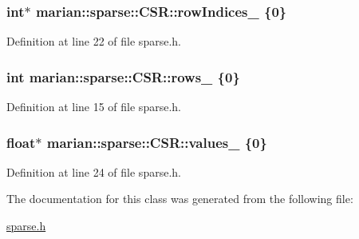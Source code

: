 \subsubsection[{\texorpdfstring{row\+Indices\+\_\+}{rowIndices_}}]{\setlength{\rightskip}{0pt plus 5cm}int$\ast$ marian\+::sparse\+::\+C\+S\+R\+::row\+Indices\+\_\+ \{0\}\hspace{0.3cm}{\ttfamily [private]}}\hypertarget{classmarian_1_1sparse_1_1CSR_a6d20131d1a2e8b89ed037bc6d4debdeb}{}\label{classmarian_1_1sparse_1_1CSR_a6d20131d1a2e8b89ed037bc6d4debdeb}


Definition at line 22 of file sparse.\+h.

\subsubsection[{\texorpdfstring{rows\+\_\+}{rows_}}]{\setlength{\rightskip}{0pt plus 5cm}int marian\+::sparse\+::\+C\+S\+R\+::rows\+\_\+ \{0\}\hspace{0.3cm}{\ttfamily [private]}}\hypertarget{classmarian_1_1sparse_1_1CSR_adc2e92a08b1ac2c6ace0c1283e4c353e}{}\label{classmarian_1_1sparse_1_1CSR_adc2e92a08b1ac2c6ace0c1283e4c353e}


Definition at line 15 of file sparse.\+h.

\subsubsection[{\texorpdfstring{values\+\_\+}{values_}}]{\setlength{\rightskip}{0pt plus 5cm}float$\ast$ marian\+::sparse\+::\+C\+S\+R\+::values\+\_\+ \{0\}\hspace{0.3cm}{\ttfamily [private]}}\hypertarget{classmarian_1_1sparse_1_1CSR_a10886b73b3ba7e2bb066b187345ba504}{}\label{classmarian_1_1sparse_1_1CSR_a10886b73b3ba7e2bb066b187345ba504}


Definition at line 24 of file sparse.\+h.



The documentation for this class was generated from the following file\+:\begin{DoxyCompactItemize}
\item 
\hyperlink{sparse_8h}{sparse.\+h}\end{DoxyCompactItemize}
